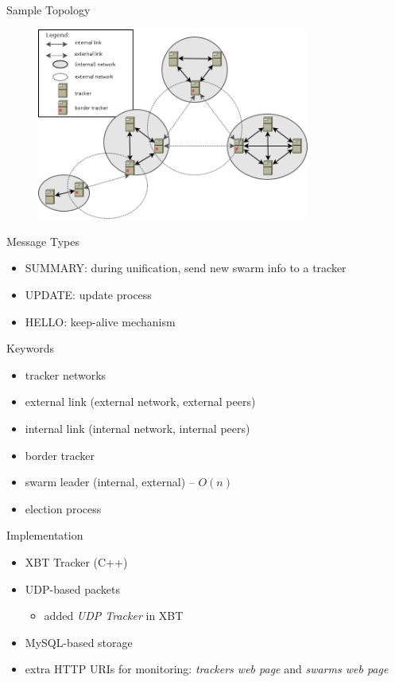 \documentclass{beamer}
\begin{document}
\begin{frame}{Sample Topology}
  \begin{figure}
    \includegraphics[width=0.8\textwidth]{img/tracker-networks.png}
  \end{figure}
\end{frame}

\begin{frame}{Message Types}
  \begin{itemize}
    \item SUMMARY: during unification, send new swarm info to a tracker
    \item UPDATE: update process
    \item HELLO: keep-alive mechanism
  \end{itemize}
\end{frame}

\begin{frame}{Keywords}
  \begin{itemize}
    \item tracker networks
    \item external link (external network, external peers)
    \item internal link (internal network, internal peers)
    \item border tracker
    \item swarm leader (internal, external) -- $O(n)$
    \item election process
  \end{itemize}
\end{frame}

\begin{frame}{Implementation}
  \begin{itemize}
    \item XBT Tracker (C++)
    \item UDP-based packets
      \begin{itemize}
        \item added \textit{UDP Tracker} in XBT
      \end{itemize}
    \item MySQL-based storage
    \item extra HTTP URIs for monitoring: \textit{trackers web page} and
    \textit{swarms web page}
  \end{itemize}
\end{frame}
\end{document}
